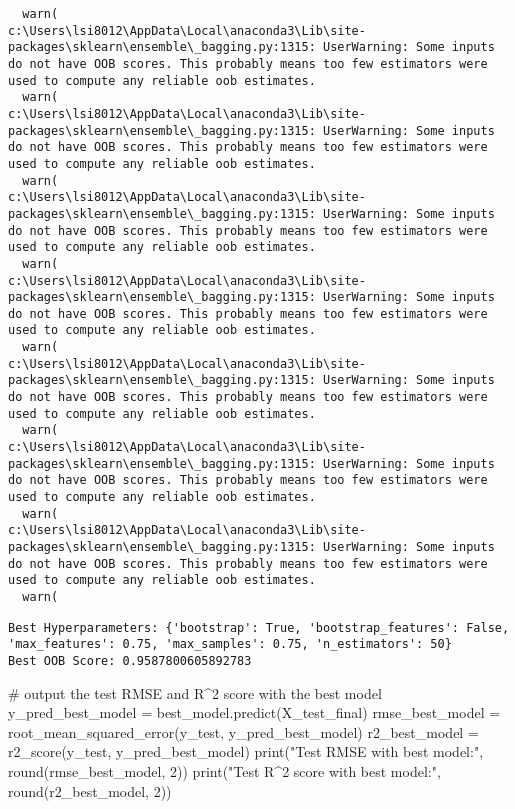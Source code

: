 \documentclass[
  letterpaper,
  DIV=11,
  numbers=noendperiod]{scrreprt}
\newenvironment{Shaded}{\begin{snugshade}}{\end{snugshade}}
\newcommand{\BuiltInTok}[1]{\textcolor[rgb]{0.00,0.23,0.31}{#1}}
\newcommand{\CommentTok}[1]{\textcolor[rgb]{0.37,0.37,0.37}{#1}}
\newcommand{\DecValTok}[1]{\textcolor[rgb]{0.68,0.00,0.00}{#1}}
\newcommand{\NormalTok}[1]{\textcolor[rgb]{0.00,0.23,0.31}{#1}}
\newcommand{\OperatorTok}[1]{\textcolor[rgb]{0.37,0.37,0.37}{#1}}
\newcommand{\StringTok}[1]{\textcolor[rgb]{0.13,0.47,0.30}{#1}}
\begin{document}
\begin{verbatim}
  warn(
c:\Users\lsi8012\AppData\Local\anaconda3\Lib\site-packages\sklearn\ensemble\_bagging.py:1315: UserWarning: Some inputs do not have OOB scores. This probably means too few estimators were used to compute any reliable oob estimates.
  warn(
c:\Users\lsi8012\AppData\Local\anaconda3\Lib\site-packages\sklearn\ensemble\_bagging.py:1315: UserWarning: Some inputs do not have OOB scores. This probably means too few estimators were used to compute any reliable oob estimates.
  warn(
c:\Users\lsi8012\AppData\Local\anaconda3\Lib\site-packages\sklearn\ensemble\_bagging.py:1315: UserWarning: Some inputs do not have OOB scores. This probably means too few estimators were used to compute any reliable oob estimates.
  warn(
c:\Users\lsi8012\AppData\Local\anaconda3\Lib\site-packages\sklearn\ensemble\_bagging.py:1315: UserWarning: Some inputs do not have OOB scores. This probably means too few estimators were used to compute any reliable oob estimates.
  warn(
c:\Users\lsi8012\AppData\Local\anaconda3\Lib\site-packages\sklearn\ensemble\_bagging.py:1315: UserWarning: Some inputs do not have OOB scores. This probably means too few estimators were used to compute any reliable oob estimates.
  warn(
c:\Users\lsi8012\AppData\Local\anaconda3\Lib\site-packages\sklearn\ensemble\_bagging.py:1315: UserWarning: Some inputs do not have OOB scores. This probably means too few estimators were used to compute any reliable oob estimates.
  warn(
c:\Users\lsi8012\AppData\Local\anaconda3\Lib\site-packages\sklearn\ensemble\_bagging.py:1315: UserWarning: Some inputs do not have OOB scores. This probably means too few estimators were used to compute any reliable oob estimates.
  warn(
\end{verbatim}

\begin{verbatim}
Best Hyperparameters: {'bootstrap': True, 'bootstrap_features': False, 'max_features': 0.75, 'max_samples': 0.75, 'n_estimators': 50}
Best OOB Score: 0.9587800605892783
\end{verbatim}

\begin{Shaded}
\begin{Highlighting}[]
\CommentTok{\# output the test RMSE and R\^{}2 score with the best model}
\NormalTok{y\_pred\_best\_model }\OperatorTok{=}\NormalTok{ best\_model.predict(X\_test\_final)}
\NormalTok{rmse\_best\_model }\OperatorTok{=}\NormalTok{ root\_mean\_squared\_error(y\_test, y\_pred\_best\_model)}
\NormalTok{r2\_best\_model }\OperatorTok{=}\NormalTok{ r2\_score(y\_test, y\_pred\_best\_model)}
\BuiltInTok{print}\NormalTok{(}\StringTok{"Test RMSE with best model:"}\NormalTok{, }\BuiltInTok{round}\NormalTok{(rmse\_best\_model, }\DecValTok{2}\NormalTok{))}
\BuiltInTok{print}\NormalTok{(}\StringTok{"Test R\^{}2 score with best model:"}\NormalTok{, }\BuiltInTok{round}\NormalTok{(r2\_best\_model, }\DecValTok{2}\NormalTok{))}
\end{Highlighting}
\end{Shaded}
\end{document}
